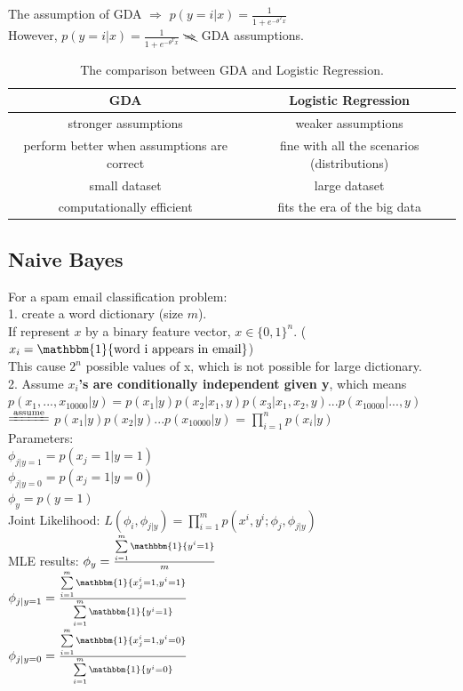 \documentclass{article}
\begin{document}
\noindent
The assumption of GDA $\Rightarrow$ $p(y=i|x) = \frac{1}{1 + e^{-\theta^Tx}}$\\
However, $p(y=i|x) = \frac{1}{1 + e^{-\theta^Tx}}$  $\bcancel{\Rightarrow}$ GDA assumptions.
\begin{table}[h]
  \begin{center}
  \begin{tabular}{cc}
    \toprule
    GDA & Logistic Regression \\
    \midrule
    stronger assumptions & weaker assumptions \\
    perform better when assumptions are correct & fine with all the scenarios (distributions) \\
    small dataset & large dataset \\
    computationally efficient & fits the era of the big data\\
    \bottomrule
  \end{tabular}
  \end{center}
  \caption{The comparison between GDA and Logistic Regression.}
  \label{tab:01}
\end{table}
\subsection{Naive Bayes}
For a spam email classification problem:\\
1. create a word dictionary (size $m$).\\
If represent $x$ by a binary feature vector, $x \in \{0,1\}^n$. ($x_i = \mathbbm{1}\{{\rm word\ i\ appears\ in\ email}\}$)\\
\indent
This cause $2^n$  possible values of x, which is not possible for large dictionary.\\
2. Assume \textbf{$x_i$'s are conditionally independent given y}, which means\\
\indent
$p(x_1, ..., x_{10000}|y) = p(x_1|y)p(x_2|x_1,y)p(x_3|x_1,x_2,y) ... p(x_{10000}|...,y)$\\
\indent
$\xlongequal{{\rm assume}}$ $p(x_1|y)p(x_2|y)...p(x_{10000}|y)$
= $\prod\limits_{i=1}^np(x_i|y)$\\

\noindent
Parameters:\\
$\phi_{j|y=1} = p(x_j=1|y=1)$\\
$\phi_{j|y=0} = p(x_j=1|y=0)$\\
$\phi_{y} = p(y=1)$\\

\noindent
Joint Likelihood: 
$L(\phi_i, \phi_{j|y}) = \prod\limits_{i=1}^mp(x^i,y^i;\phi_j,\phi_{j|y})$\\
MLE results:
$\phi_y = \frac{\sum\limits_{i=1}^m\mathbbm{1}\{y^i=1\}}{m}$\\
$\phi_{j|y=1} = \frac{\sum\limits_{i=1}^m\mathbbm{1}\{x_j^i=1,y^i=1\}}{\sum\limits_{i=1}^m\mathbbm{1}\{y^i=1\}}$\\
$\phi_{j|y=0} = \frac{\sum\limits_{i=1}^m\mathbbm{1}\{x_j^i=1,y^i=0\}}{\sum\limits_{i=1}^m\mathbbm{1}\{y^i=0\}}$\\
\end{document}
